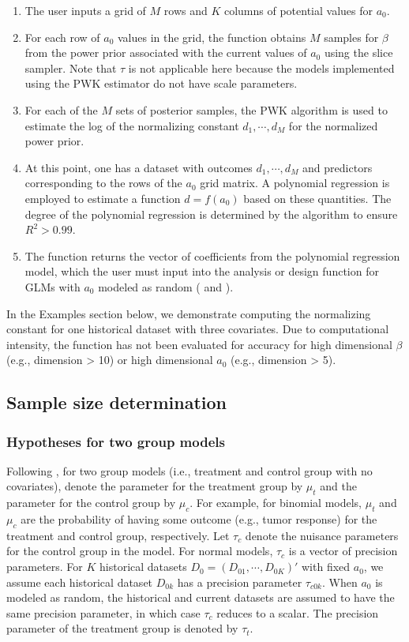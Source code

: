 \begin{enumerate}
\item  The user inputs a grid of $M$ rows and $K$ columns of potential values for $a_0$. 
\item For each row of $a_0$ values in the grid, the function obtains $M$ samples for $\beta$ from the power prior associated with the current values of $a_0$ using the slice sampler. Note that $\tau$ is not applicable here because the models implemented using the PWK estimator do not have scale parameters. 
\item For each of the $M$ sets of posterior samples, the PWK algorithm \citep{pwk_2018} is used to estimate the log of the normalizing constant $d_1,\cdots, d_M$ for the normalized power prior. 
\item At this point, one has a dataset with outcomes $d_1,\cdots, d_M$ and predictors corresponding to the rows of the $a_0$ grid matrix. A polynomial regression is employed to estimate a function $d = f(a_0)$ based on these quantities. The degree of the polynomial regression is determined by the algorithm to ensure $R^2 > 0.99$.
\item The  function returns the vector of coefficients from the polynomial regression model, which the user must input into the analysis or design function for GLMs with $a_0$ modeled as random ( and ).
\end{enumerate}
In the Examples section below, we demonstrate computing the normalizing constant for one historical dataset with three covariates. Due to computational intensity, the   function has not been evaluated for accuracy for high dimensional  $\beta$ (e.g., dimension > 10) or high dimensional $a_0$ (e.g., dimension > 5). 




\subsection*{Sample size determination}
\subsubsection*{Hypotheses for two group models}

Following \cite{Chen_2011}, for two group models (i.e., treatment and control group with no covariates), denote the parameter for the treatment group by $\mu_t$ and the parameter for the control group by $\mu_c$. For example, for binomial models, $\mu_t$ and $\mu_c$ are the probability of having some outcome (e.g., tumor response) for the treatment and control group, respectively. Let $\tau_c$ denote the nuisance parameters for the control group in the model. For normal models, $\tau_c$ is a vector of precision parameters. For $K$ historical datasets $D_0 = (D_{01},\cdots, D_{0K})'$ with fixed $a_0$, we assume each historical dataset $D_{0k}$ has a precision parameter $\tau_{c0k}$. When $a_0$ is modeled as random, the historical and current datasets are assumed to have the same precision parameter, in which case $\tau_c$ reduces to a scalar. The precision parameter of the treatment group is denoted by $\tau_t$. 

